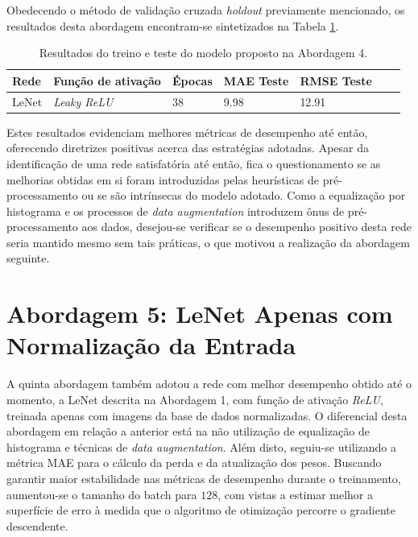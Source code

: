 	Obedecendo o método de validação cruzada \emph{holdout} previamente mencionado, os resultados desta abordagem encontram-se sintetizados na Tabela \ref{tab:results-4}.

	\begin{table}[!ht]
		\centering
		\caption{Resultados do treino e teste do modelo proposto na Abordagem 4.}
		\label{tab:results-4}
			\begin{tabular}{l l l l l l l}
				\toprule
				Rede & Função de ativação & Épocas & MAE Teste & RMSE Teste \\
				\midrule
				LeNet & \emph{Leaky ReLU} & 38 & 9.98 & 12.91 \\
				\bottomrule
			\end{tabular}
	\end{table}

	Estes resultados evidenciam melhores métricas de desempenho até então, oferecendo diretrizes positivas acerca das estratégias adotadas. Apesar da identificação de uma rede satisfatória até então, fica o questionamento se as melhorias obtidas em si foram introduzidas pelas heurísticas de pré-processamento ou se são intrínsecas do modelo adotado. Como a equalização por histograma e os processos de \emph{data augmentation} introduzem ônus de pré-processamento aos dados, desejou-se verificar se o desempenho positivo desta rede seria mantido mesmo sem tais práticas, o que motivou a realização da abordagem seguinte.

\section{Abordagem 5: LeNet Apenas com Normalização da Entrada}%
	A quinta abordagem também adotou a rede com melhor desempenho obtido até o momento, a LeNet descrita na Abordagem 1, com função de ativação \emph{ReLU}, treinada apenas com imagens da base de dados normalizadas. O diferencial desta abordagem em relação a anterior está na não utilização de equalização de histograma e técnicas de \emph{data augmentation}. Além disto, seguiu-se utilizando a métrica MAE para o cálculo da perda e da atualização dos pesos. Buscando garantir maior estabilidade nas métricas de desempenho durante o treinamento, aumentou-se o tamanho do batch para $128$, com vistas a estimar melhor a superfície de erro à medida que o algoritmo de otimização percorre o gradiente descendente.

